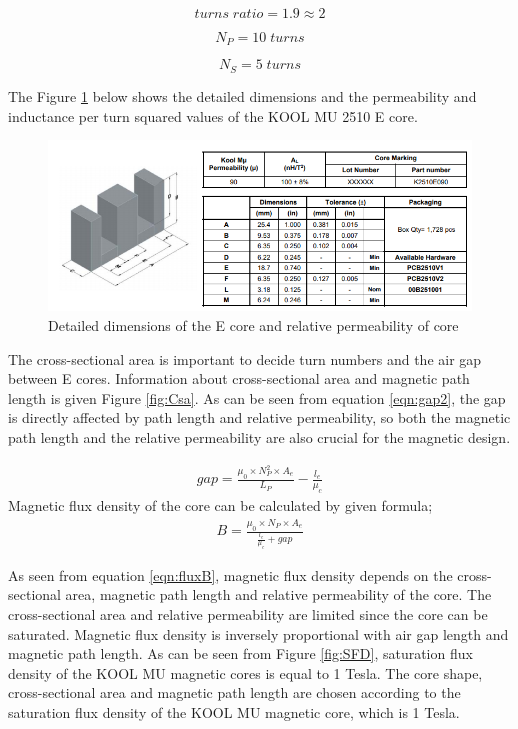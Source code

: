 $$ turns\; ratio = 1.9 \approx 2 $$

$$ N_P = 10\; turns $$

$$ N_S = 5\; turns $$

The Figure \ref{fig:Permeability} below shows the detailed dimensions and the permeability and inductance per turn squared values of the KOOL MU 2510 E core.

\begin{figure}[!h]
\centering
\includegraphics [width=1\textwidth]{figures/core.png}
\caption{Detailed dimensions of the E core and relative permeability of core }
\label{fig:Permeability}
\end{figure}

The cross-sectional area is important to decide turn numbers and the air gap between E cores. Information about cross-sectional area and magnetic path length is given Figure \ref{fig:Csa}. As can be seen from equation \eqref{eqn:gap2}, the gap is directly affected by path length and relative permeability, so both the magnetic path length and the relative permeability are also crucial for the magnetic design.

\begin{align}
    gap=\frac{\mu_0\times N_P^2 \times A_e}{L_P}-\frac{l_e}{\mu_c}
    \label{eqn:gap2}
\end{align}
Magnetic flux density of the core can be calculated by given formula;
\begin{align}
    B=\frac{\mu_0\times N_P\times A_e}{\frac{l_e}{\mu_c}+gap}
    \label{eqn:fluxB}
\end{align}

As seen from equation \eqref{eqn:fluxB}, magnetic flux density depends on the cross-sectional area, magnetic path length and relative permeability of the core. The cross-sectional area and relative permeability are limited since the core can be saturated. Magnetic flux density is inversely proportional with air gap length and magnetic path length. As can be seen from Figure \ref{fig:SFD}, saturation flux density of the KOOL MU magnetic cores is equal to 1 Tesla. The core shape, cross-sectional area and magnetic path length are chosen according to the saturation flux density of the KOOL MU magnetic core, which is 1 Tesla.

